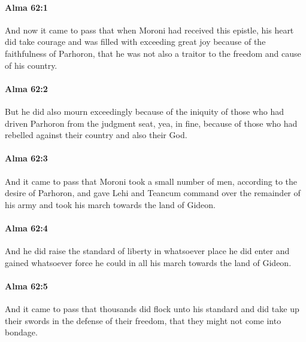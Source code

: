		\paragraph{Alma 62:1} %
			\label{ALMA-62-1}

			And now it came to pass that when Moroni had received this epistle,
			his heart did take courage and was filled with exceeding great joy
			because of the faithfulness of Parhoron,
			that he was not also a traitor to the freedom and cause of his country.

		\paragraph{Alma 62:2} %
			\label{ALMA-62-2}

			But he did also mourn exceedingly
			because of the iniquity of those
			who had driven Parhoron from the judgment seat,
			yea, in fine, because of those who had rebelled
			against their country and also their God.

		\paragraph{Alma 62:3} %
			\label{ALMA-62-3}

			And it came to pass that Moroni took a small number of men,
			according to the desire of Parhoron,
			and gave Lehi and Teancum command over the remainder of his army
			and took his march towards the land of Gideon.

		\paragraph{Alma 62:4} %
			\label{ALMA-62-4}

			And he did raise the standard of liberty
			in whatsoever place he did enter
			and gained whatsoever force he could
			in all his march towards the land of Gideon.

		\paragraph{Alma 62:5} %
			\label{ALMA-62-5}

			And it came to pass that thousands did flock unto his standard
			and did take up their swords in the defense of their freedom,
			that they might not come into bondage.

